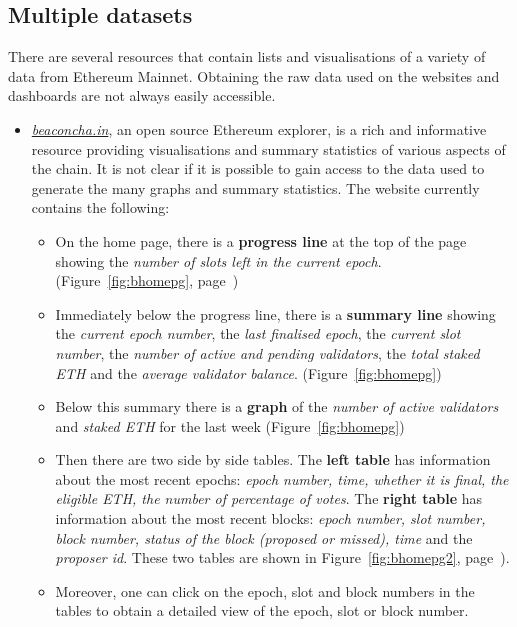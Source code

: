 \documentclass[UTF8]{article}
\begin{document}
{%
\subsection{Multiple datasets}
There are several resources that contain lists and visualisations of a variety of data from Ethereum Mainnet. Obtaining the raw data used on the websites and dashboards are not always easily accessible.
\label{sec:multiple}
\begin{itemize}
	\item \textit{\href{https://beaconcha.in/}{beaconcha.in}}, an open source Ethereum explorer, is a rich and informative resource providing visualisations and summary statistics of various aspects of the chain. It is not clear if it is possible to gain access to the data used to generate the many graphs and summary statistics. The website currently contains the following:
	\begin{itemize}
		\item On the home page, there is a \textbf{progress line} at the top of the page showing the \textit{number of slots left in the current epoch}. (Figure~\ref{fig:bhomepg}, page~\pageref{fig:bhomepg})
		\item Immediately below the progress line, there is a \textbf{summary line} showing the \textit{current epoch number}, the \textit{last finalised epoch}, the \textit{current slot number}, the \textit{number of active and pending validators}, the \textit{total staked ETH} and the \textit{average validator balance}. (Figure~\ref{fig:bhomepg})
		\item Below this summary there is a \textbf{graph} of the \textit{number of active validators} and \textit{staked ETH} for the last week (Figure~\ref{fig:bhomepg})
		\item Then there are two side by side tables. The \textbf{left table} has information about the most recent epochs: \textit{epoch number, time, whether it is final, the eligible ETH, the number of percentage of votes}. The \textbf{right table} has information about the most recent blocks: \textit{epoch number, slot number, block number, status of the block (proposed or missed), time} and the \textit{proposer id}. These two tables are shown in Figure~\ref{fig:bhomepg2}, page~\pageref{fig:bhomepg2}).\\
		\item Moreover, one can click on the epoch, slot and block numbers in the tables to obtain a detailed view of the epoch, slot or block number. 

\end{itemize}
\end{itemize}}
\end{document}
